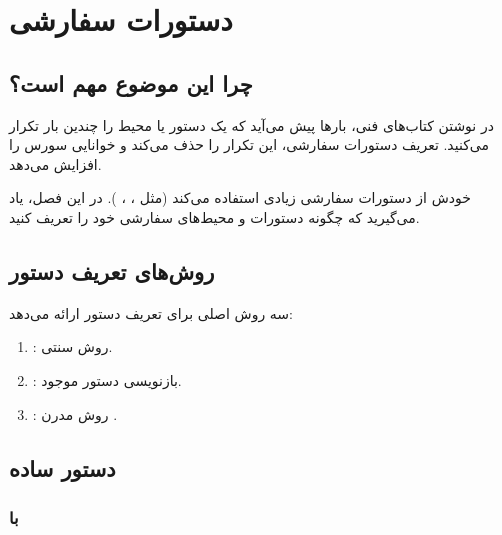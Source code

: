 
\chapter{دستورات سفارشی}
\label{chap:custom-commands}

\section{چرا این موضوع مهم است؟}
\label{sec:custom-commands-why}

در نوشتن کتاب‌های فنی، بارها پیش می‌آید که
یک دستور یا محیط را چندین بار تکرار می‌کنید.
تعریف دستورات سفارشی، این تکرار را حذف
می‌کند و خوانایی سورس را افزایش می‌دهد.

 خودش از دستورات سفارشی زیادی
استفاده می‌کند (مثل ، ،
). در این فصل، یاد می‌گیرید که
چگونه دستورات و محیط‌های سفارشی خود را
تعریف کنید.


\section{روش‌های تعریف دستور}
\label{sec:custom-commands-methods}

 سه روش اصلی برای تعریف دستور
ارائه می‌دهد:

\begin{enumerate}
    \item {}: روش سنتی.
    \item {}: بازنویسی دستور
    موجود.
    \item {}: روش مدرن
    .
\end{enumerate}


\section{دستور ساده}
\label{sec:custom-commands-simple}

\subsection{با }
\label{sec:custom-commands-newcommand}

